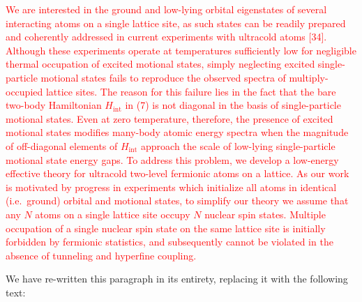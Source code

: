 \documentclass[preprint]{revtex4-1}
\renewcommand{\t}{\text} %
\newcommand{\1}{\mathds{1}}
\newcommand{\red}[1]{\textcolor{red}{#1}}
\begin{document}
\begin{enumerate}
  \red{We are interested in the ground and low-lying orbital
    eigenstates of several interacting atoms on a single lattice site,
    as such states can be readily prepared and coherently addressed in
    current experiments with ultracold atoms [34].  Although these
    experiments operate at temperatures sufficiently low for
    negligible thermal occupation of excited motional states, simply
    neglecting excited single-particle motional states fails to
    reproduce the observed spectra of multiply-occupied lattice sites.
    The reason for this failure lies in the fact that the bare
    two-body Hamiltonian $H_{\t{int}}$ in (7) is not diagonal in the
    basis of single-particle motional states.  Even at zero
    temperature, therefore, the presence of excited motional states
    modifies many-body atomic energy spectra when the magnitude of
    off-diagonal elements of $H_{\t{int}}$ approach the scale of
    low-lying single-particle motional state energy gaps.  To address
    this problem, we develop a low-energy effective theory for
    ultracold two-level fermionic atoms on a lattice.  As our work is
    motivated by progress in experiments which initialize all atoms in
    identical (i.e.~ground) orbital and motional states, to simplify
    our theory we assume that any $N$ atoms on a single lattice site
    occupy $N$ nuclear spin states.  Multiple occupation of a single
    nuclear spin state on the same lattice site is initially forbidden
    by fermionic statistics, and subsequently cannot be violated in
    the absence of tunneling and hyperfine coupling.}

  We have re-written this paragraph in its entirety, replacing it with
  the following text:


\end{enumerate}
\end{document}
